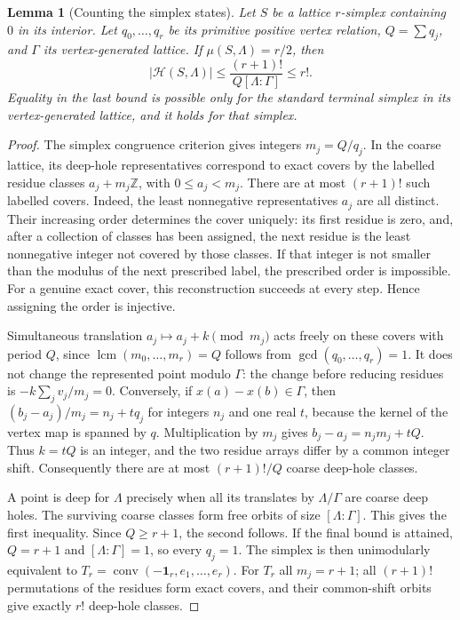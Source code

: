 \documentclass[11pt,a4paper]{article}
\newtheorem{lemma}[theorem]{Lemma}
\theoremstyle{remark}\newtheorem{remark}[theorem]{Remark}
\begin{document}
\begin{lemma}[Counting the simplex states]\label{ce:simplex-count}
Let $S$ be a lattice $r$-simplex containing $0$ in its interior.
Let $q_0,\ldots,q_r$ be its primitive positive vertex relation,
$Q=\sum q_j$, and $\Gamma$ its vertex-generated lattice.
If $\mu(S,\Lambda)=r/2$, then
\[
 |\mathcal H(S,\Lambda)|
 \le \frac{(r+1)!}{Q[\Lambda:\Gamma]}\le r!.
\]
Equality in the last bound is possible only for the standard
terminal simplex in its vertex-generated lattice, and it holds
for that simplex.
\end{lemma}
\begin{proof}
The simplex congruence criterion gives integers $m_j=Q/q_j$.
In the coarse lattice, its deep-hole representatives correspond
to exact covers by the labelled residue classes
$a_j+m_j\mathbb Z$, with $0\le a_j<m_j$.
There are at most $(r+1)!$ such labelled covers. Indeed, the
least nonnegative representatives $a_j$ are all distinct. Their
increasing order determines the cover uniquely: its first residue
is zero, and, after a collection of classes has been assigned,
the next residue is the least nonnegative integer not covered by
those classes. If that integer is not smaller than the modulus
of the next prescribed label, the prescribed order is impossible.
For a genuine exact cover, this reconstruction succeeds at every
step. Hence assigning the order is injective.

Simultaneous translation $a_j\mapsto a_j+k\pmod{m_j}$ acts
freely on these covers with period $Q$, since
$\operatorname{lcm}(m_0,\ldots,m_r)=Q$ follows from
$\gcd(q_0,\ldots,q_r)=1$. It does not change the represented
point modulo $\Gamma$: the change before reducing residues is
$-k\sum_j v_j/m_j=0$. Conversely, if $x(a)-x(b)\in\Gamma$,
then $(b_j-a_j)/m_j=n_j+tq_j$ for integers $n_j$ and one real
$t$, because the kernel of the vertex map is spanned by $q$.
Multiplication by $m_j$ gives
$b_j-a_j=n_jm_j+tQ$. Thus $k=tQ$ is an integer, and the
two residue arrays differ by a common integer shift.
Consequently there are at most $(r+1)!/Q$ coarse deep-hole classes.

A point is deep for $\Lambda$ precisely when all its translates
by $\Lambda/\Gamma$ are coarse deep holes. The surviving coarse
classes form free orbits of size $[\Lambda:\Gamma]$. This gives
the first inequality. Since $Q\ge r+1$, the second follows.
If the final bound is attained, $Q=r+1$ and
$[\Lambda:\Gamma]=1$, so every $q_j=1$. The simplex is then
unimodularly equivalent to
$T_r=\operatorname{conv}(-\mathbf1_r,e_1,\ldots,e_r)$.
For $T_r$ all $m_j=r+1$; all $(r+1)!$ permutations of the residues
form exact covers, and their common-shift orbits give exactly $r!$
deep-hole classes.
\end{proof}
\end{document}
